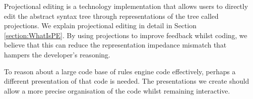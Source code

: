Projectional editing is a technology implementation that allows users to directly edit the abstract syntax tree through representations of the tree called projections.
We explain projectional editing in detail in Section \ref{section:WhatIsPE}.
By using projections to improve feedback whilst coding, we believe that this can reduce the representation impedance mismatch that hampers the developer's reasoning.

To reason about a large code base of rules engine code effectively, perhaps a different presentation of that code is needed.
The presentations we create should allow a more precise organisation of the code whilst remaining interactive.



